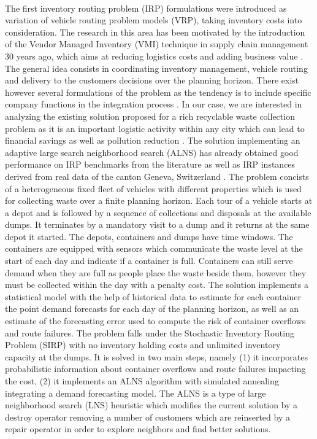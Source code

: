 \documentclass[12pt,a4paper]{article}
\begin{document}
\paragraph{}The first inventory routing problem (IRP) formulations were introduced as variation of vehicle routing problem models (VRP), taking inventory costs into consideration. The research in this area has been motivated by the introduction of the Vendor Managed Inventory (VMI) technique in supply chain management 30 years ago, which aims at reducing logistics costs and adding business value \citep{Coelho2014}. The general idea consists in coordinating inventory management, vehicle routing and delivery to the customers decisions over the planning horizon. There exist however several formulations of the problem as the tendency is to include specific company functions in the integration process \citep{Bertazzi2012}. In our case, we are interested in analyzing the existing solution proposed for a rich recyclable waste collection problem as it is an important logistic activity within any city which can lead to financial savings as well as pollution reduction \citep{Buhrkal2012}. The solution implementing an adaptive large search neighborhood search (ALNS) has already obtained good performance on IRP benchmarks from the literature as well as IRP instances derived from real data of the canton Geneva, Switzerland \citep{Markov2016}. The problem concists of a heterogeneous fixed fleet of vehicles with different properties which is used for collecting waste over a finite planning horizon. Each tour of a vehicle starts at a depot and is followed by a sequence of collections and disposals at the available dumps. It terminates by a mandatory visit to a dump and it returns at the same depot it started. The depots, containers and dumps have time windows. The containers are equipped with sensors which communicate the waste level at the start of each day and indicate if a container is full. Containers can still serve demand when they are full as people place the waste beside them, however they must be collected within the day with a penalty cost. The solution implements a statistical model with the help of historical data to estimate for each container the point demand forecasts for each day of the planning horizon, as well as an estimate of the forecasting error used to compute the risk of container overflows and route failures. The problem falls under the Stochastic Inventory Routing Problem (SIRP) with no inventory holding costs and unlimited inventory capacity at the dumps. It is solved in two main steps, namely (1) it incorporates probabilistic information about container overflows and route failures impacting the cost, (2) it implements an ALNS algorithm with simulated annealing integrating a demand forecasting model. The ALNS is a type of large neighborhood search (LNS) heuristic which modifies the current solution by a destroy operator removing a number of customers which are reinserted by a repair operator in order to explore neighbors and find better solutions.
\end{document}
